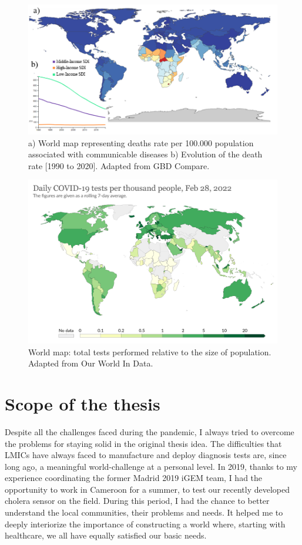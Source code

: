 \begin{figure}[ht]
    \centering
    \includegraphics[width=1\textwidth]{figures/Deaths map.png}
    \caption{a) World map representing deaths rate per 100.000 population associated with communicable diseases b) Evolution of the death rate [1990 to 2020]. Adapted from GBD Compare\cite{institute_for_health_metrics_and_evaluation_ihme_uniersity_of_washington_gbd_2015}.}
    \label{fig:Deaths}
\end{figure}
\begin{figure}[b]
    \centering
    \includegraphics[width=1\textwidth]{figures/diagnosis map.png}
    \caption{World map: total tests performed relative to the size of population. Adapted from Our World In Data\cite{ritchie_coronavirus_2020}.}
    \label{fig:Diagnosis}
\end{figure}
\newpage
\section{Scope of the thesis}
Despite all the challenges faced during the pandemic, I always tried to overcome the problems for staying solid in the original thesis idea. The difficulties that LMICs have always faced to manufacture and deploy diagnosis tests are, since long ago, a meaningful world-challenge at a personal level. In 2019, thanks to my experience coordinating the former Madrid 2019 iGEM team\cite{igem_madrid_2019_aegis_2019}, I had the opportunity to work in Cameroon for a summer, to test our recently developed cholera sensor on the field. During this period, I had the chance to better understand the local communities, their problems and needs. It helped me to deeply interiorize the importance of constructing a world where, starting with healthcare, we all have equally satisfied our basic needs. 


